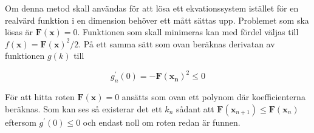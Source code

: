 Om denna metod skall användas för att lösa ett ekvationssystem istället för en realvärd funktion i en dimension behöver ett mått sättas upp. Problemet som ska lösas är $\mathbf{F}(\mathbf{x}) = 0$.
Funktionen som skall minimeras kan med fördel väljas till $f(\mathbf{x}) = \mathbf{F}(\mathbf{x})^2/2$.
På ett samma sätt som ovan beräknas derivatan av funktionen $g(k)$ till\cite{fortran77}

\begin{equation}
\label{eq:newtonvecg}
g_n^\prime(0) = - \mathbf{F}(\mathbf{x_n})^2 \le 0
\end{equation}

För att hitta roten $\mathbf{F}(\mathbf{x}) = 0$ ansätts som ovan ett polynom där koefficienterna beräknas.
Som kan ses så existerar det ett $k_n$ sådant att $\mathbf{F}(\mathbf{x}_{n+1}) \le \mathbf{F}(\mathbf{x}_n)$ eftersom
$g^\prime(0) \le 0$ och endast noll om roten redan är funnen.


